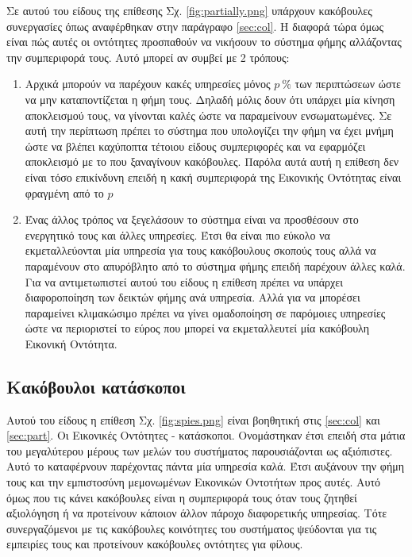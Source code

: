 Σε αυτού του είδους της επίθεσης Σχ. \ref{fig:partially.png} υπάρχουν κακόβουλες συνεργασίες όπως αναφέρθηκαν στην παράγραφο \ref{sec:col}. Η διαφορά τώρα όμως είναι πώς αυτές οι οντότητες προσπαθούν να νικήσουν το σύστημα φήμης αλλάζοντας την συμπεριφορά τους. Αυτό μπορεί αν συμβεί με 2 τρόπους: 
\begin{enumerate}

\item Αρχικά μπορούν να παρέχουν κακές υπηρεσίες μόνος $ p \ \%  $ των περιπτώσεων ώστε να μην καταποντίζεται η φήμη τους. Δηλαδή μόλις δουν ότι υπάρχει μία κίνηση αποκλεισμού τους, να γίνονται καλές ώστε να παραμείνουν ενσωματωμένες. Σε αυτή την περίπτωση πρέπει το σύστημα που υπολογίζει την φήμη να έχει μνήμη ώστε να βλέπει καχύποπτα τέτοιου είδους συμπεριφορές και να εφαρμόζει αποκλεισμό με το που ξαναγίνουν κακόβουλες. Παρόλα αυτά αυτή η επίθεση δεν είναι τόσο επικίνδυνη επειδή η κακή συμπεριφορά της Εικονικής Οντότητας είναι φραγμένη από το $p$

\item Ένας άλλος τρόπος να ξεγελάσουν το σύστημα είναι να προσθέσουν στο ενεργητικό τους και άλλες υπηρεσίες. Έτσι θα είναι πιο εύκολο να εκμεταλλεύονται μία υπηρεσία για τους κακόβουλους σκοπούς τους αλλά να παραμένουν στο απυρόβλητο από το σύστημα φήμης επειδή παρέχουν άλλες καλά. Για να αντιμετωπιστεί αυτού του είδους η επίθεση πρέπει να υπάρχει διαφοροποίηση των δεικτών φήμης ανά υπηρεσία. Αλλά για να μπορέσει παραμείνει κλιμακώσιμο πρέπει να γίνει ομαδοποίηση σε παρόμοιες υπηρεσίες ώστε να περιοριστεί το εύρος που μπορεί να εκμεταλλευτεί μία κακόβουλη Εικονική Οντότητα.
\end{enumerate}

\newpage
\subsection{Κακόβουλοι κατάσκοποι}\label{sec:spies}

Αυτού του είδους η επίθεση  Σχ. \ref{fig:spies.png} είναι βοηθητική στις \ref{sec:col} και \ref{sec:part}. Οι Εικονικές Οντότητες - κατάσκοποι. Ονομάστηκαν έτσι επειδή στα μάτια του μεγαλύτερου μέρους των μελών του συστήματος παρουσιάζονται ως αξιόπιστες. Αυτό το καταφέρνουν παρέχοντας πάντα μία υπηρεσία καλά. Έτσι αυξάνουν την φήμη τους και την εμπιστοσύνη μεμονωμένων Εικονικών Οντοτήτων προς αυτές. Αυτό όμως που τις κάνει κακόβουλες είναι η συμπεριφορά τους όταν τους ζητηθεί αξιολόγηση ή να προτείνουν κάποιον άλλον πάροχο διαφορετικής υπηρεσίας. Τότε συνεργαζόμενοι με τις κακόβουλες κοινότητες του συστήματος ψεύδονται για τις εμπειρίες τους και προτείνουν κακόβουλες οντότητες για φίλους.

